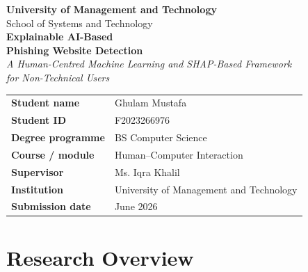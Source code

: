 \documentclass[11pt,a4paper]{article}
\renewcommand{\arraystretch}{1.25}
\begin{document}
\begin{titlepage}
\centering
\vspace*{1.5cm}

{\large\textbf{University of Management and Technology}}\\[0.3cm]
{\normalsize School of Systems and Technology}\\[2.5cm]

{\Huge\textbf{Explainable AI-Based}}\\[0.4cm]
{\Huge\textbf{Phishing Website Detection}}\\[1.0cm]

{\large\itshape A Human-Centred Machine Learning and SHAP-Based Framework\\
for Non-Technical Users}\\[2.0cm]

\renewcommand{\arraystretch}{1.4}
\begin{tabular}{>{\bfseries}p{4.5cm} p{7.5cm}}
\toprule
Student name      & Ghulam Mustafa \\
Student ID        & F2023266976 \\
Degree programme  & BS Computer Science \\
Course / module   & Human--Computer Interaction \\
Supervisor        & Ms. Iqra Khalil \\
Institution       & University of Management and Technology \\
Submission date   & June 2026 \\
\bottomrule
\end{tabular}

\vfill
\end{titlepage}


\tableofcontents
\clearpage

\listoffigures
\clearpage

\listoftables
\clearpage

\section*{Research Overview}
\end{document}
